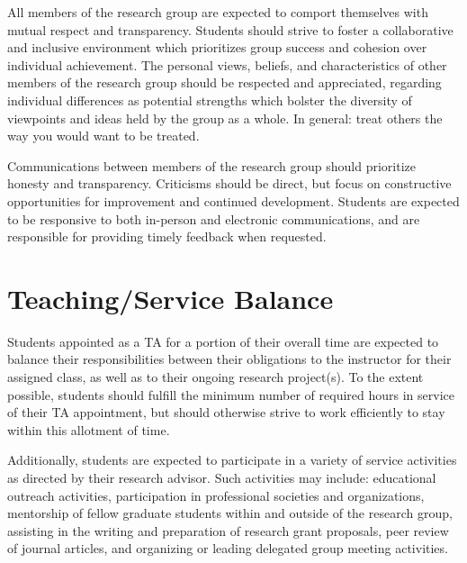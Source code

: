 \documentclass[12pt,a4paper,article,oneside]{memoir} %
\begin{document}
All members of the research group are expected to comport themselves with mutual respect and transparency. Students should strive to foster a collaborative and inclusive environment which prioritizes group success and cohesion over individual achievement. The personal views, beliefs, and characteristics of other members of the research group should be respected and appreciated, regarding individual differences as potential strengths which bolster the diversity of viewpoints and ideas held by the group as a whole. In general: treat others the way you would want to be treated.

Communications between members of the research group should prioritize honesty and transparency. Criticisms should be direct, but focus on constructive opportunities for improvement and continued development. Students are expected to be responsive to both in-person and electronic communications, and are responsible for providing timely feedback when requested.


\section{Teaching/Service Balance}

Students appointed as a TA for a portion of their overall time are expected to balance their responsibilities between their obligations to the instructor for their assigned class, as well as to their ongoing research project(s). To the extent possible, students should fulfill the minimum number of required hours in service of their TA appointment, but should otherwise strive to work efficiently to stay within this allotment of time.

Additionally, students are expected to participate in a variety of service activities as directed by their research advisor. Such activities may include: educational outreach activities, participation in professional societies and organizations, mentorship of fellow graduate students within and outside of the research group, assisting in the writing and preparation of research grant proposals, peer review of journal articles, and organizing or leading delegated group meeting activities.
\end{document}
